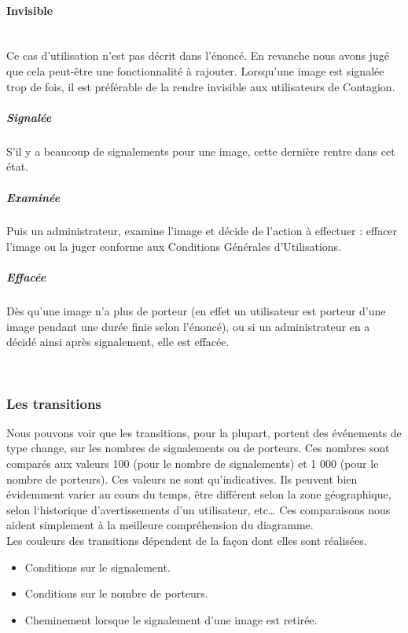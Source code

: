 \documentclass[11pt,a4paper]{article}
\begin{document}
\paragraph{Invisible}~\\
Ce cas d’utilisation n’est pas décrit dans l’énoncé. En
revanche nous avons jugé que cela peut-être une
fonctionnalité à rajouter. Lorsqu’une image est signalée
trop de fois, il est préférable de la rendre invisible aux
utilisateurs de Contagion.

\subparagraph{Signalée}
S’il y a beaucoup de signalements pour une image, cette
dernière rentre dans cet état.

\subparagraph{Examinée}
Puis un administrateur, examine l’image et décide de
l’action à effectuer : effacer l’image ou la juger
conforme aux Conditions Générales d’Utilisations.

\subparagraph{Effacée}
Dès qu’une image n’a plus de porteur (en effet un
utilisateur est porteur d’une image pendant une durée
finie selon l’énoncé), ou si un administrateur en a décidé
ainsi après signalement, elle est effacée.

~\\

\subsubsection{Les transitions}

Nous pouvons voir que les transitions, pour la plupart, 
portent des événements de type change, sur les nombres de 
signalements ou de porteurs. Ces nombres sont comparés aux 
valeurs 100 (pour le nombre de signalements) et 1 000 
(pour le nombre de porteurs). Ces valeurs ne sont 
qu’indicatives. Ils peuvent bien évidemment varier au 
cours du temps, être différent selon la zone géographique, 
selon l‘historique d’avertissements d’un utilisateur, etc… 
Ces comparaisons nous aident simplement à la meilleure 
compréhension du diagramme.\\
Les couleurs des transitions dépendent de la façon dont
elles sont réalisées.
\begin{itemize}
	\item \textcolor{myDarkRed}{Conditions sur le signalement.}
	\item \textcolor{myPurple}{Conditions sur le nombre de porteurs.}
	\item \textcolor{myGreen}{Cheminement lorsque le signalement d'une image est retirée.}
\end{itemize}
\end{document}
